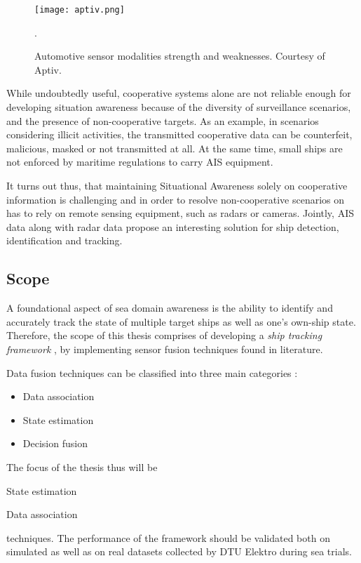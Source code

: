 \begin{figure}[H]
	\centering
	\texttt{[image: aptiv.png]}
	\caption{Automotive sensor modalities strength and weaknesses. Courtesy of Aptiv.}.
	\label{fig:taylor_approximation}
\end{figure}

While undoubtedly useful, cooperative systems alone are not reliable enough for developing situation awareness because of the diversity of surveillance scenarios, and the presence of non-cooperative targets. As an example, in scenarios considering illicit activities, the transmitted cooperative data can be counterfeit, malicious, masked or not transmitted at all. At the same time, small ships are not enforced by maritime regulations to carry AIS equipment. 

It turns out thus, that maintaining Situational Awareness solely on cooperative information is challenging and in order to resolve non-cooperative scenarios on has to rely on remote sensing equipment, such as radars or cameras. Jointly, AIS data along with radar data propose an interesting solution for ship detection, identification and tracking.


\subsection{Scope}


A foundational aspect of sea domain awareness is the ability to identify and accurately track the state of multiple target ships as well as one's own-ship state. Therefore, the scope of this thesis comprises of developing a \emph{ship tracking framework} , by implementing sensor fusion techniques found in literature.

Data fusion techniques can be classified into three main categories  \cite{nedo2013}:
\begin{itemize}
	\item Data association
	\item State estimation
	\item Decision fusion
\end{itemize}

 The focus of the thesis thus will be\begin{mylist}
	\item State estimation
	\item Data association
\end{mylist}
techniques. The performance of the framework should be validated both on simulated as well as on real datasets collected by DTU Elektro during sea trials.

